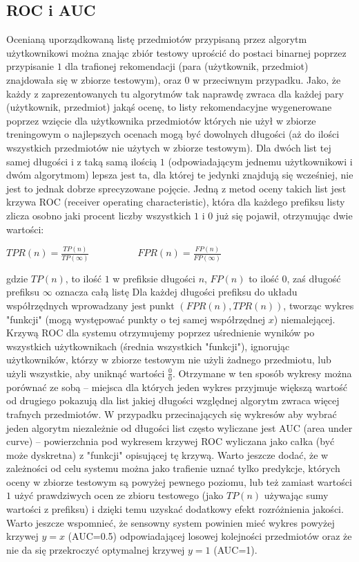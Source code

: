 \documentclass{pracamgr}
\begin{document}
   \subsection{ROC i AUC}
    Ocenianą uporządkowaną listę przedmiotów przypisaną przez algorytm użytkownikowi można znając zbiór testowy uprościć do postaci binarnej
    poprzez przypisanie $1$ dla trafionej rekomendacji (para (użytkownik, przedmiot) znajdowała się w zbiorze testowym), oraz $0$ w przeciwnym przypadku.
    Jako, że każdy z zaprezentowanych tu algorytmów tak naprawdę zwraca dla każdej pary (użytkownik, przedmiot) jakąś ocenę,
    to listy rekomendacyjne wygenerowane poprzez wzięcie dla użytkownika przedmiotów których nie użył w zbiorze treningowym o najlepszych ocenach
    mogą być dowolnych długości (aż do ilości wszystkich przedmiotów nie użytych w zbiorze testowym).
    Dla dwóch list tej samej długości i z taką samą ilością $1$ (odpowiadającym jednemu użytkownikowi i dwóm algorytmom) lepsza jest ta,
    dla której te jedynki znajdują się wcześniej, nie jest to jednak dobrze sprecyzowane pojęcie.
    Jedną z metod oceny takich list jest krzywa ROC (receiver operating characteristic), która dla każdego prefiksu listy zlicza osobno
    jaki procent liczby wszystkich $1$ i $0$ już się pojawił, otrzymując dwie wartości:
    \begin{center}
     $TPR(n)=\frac{TP(n)}{TP(\infty)}\quad\quad\quad\quad\quad
     FPR(n)=\frac{FP(n)}{FP(\infty)}$
    \end{center}
    {\scriptsize
     gdzie $TP(n)$, to ilość $1$ w prefiksie długości $n$, $FP(n)$ to ilość $0$, zaś długość prefiksu $\infty$ oznacza całą listę
    }\newline
    Dla każdej długości prefiksu do układu współrzędnych wprowadzany jest punkt\newline
    $(FPR(n),TPR(n))$, tworząc wykres "funkcji"
    (mogą występować punkty o tej samej współrzędnej $x$) niemalejącej. Krzywą ROC dla systemu otrzymujemy poprzez uśrednienie wyników
    po wszystkich użytkownikach (średnia wszystkich "funkcji"), ignorując użytkowników, którzy w zbiorze testowym nie użyli żadnego przedmiotu,
    lub użyli wszystkie, aby uniknąć wartości $\frac{0}{0}$.
    Otrzymane w ten sposób wykresy można porównać ze sobą -- miejsca dla których jeden wykres przyjmuje większą wartość od drugiego pokazują
    dla list jakiej długości względnej algorytm zwraca więcej trafnych przedmiotów.
    W przypadku przecinających się wykresów aby wybrać jeden algorytm niezależnie od długości list często wyliczane jest AUC (area under curve) --
    powierzchnia pod wykresem krzywej ROC wyliczana jako całka (być może dyskretna) z "funkcji" opisującej tę krzywą.
    Warto jeszcze dodać, że w zależności od celu systemu można jako trafienie uznać tylko predykcje, których oceny w zbiorze testowym są powyżej pewnego poziomu,
    lub też zamiast wartości $1$ użyć prawdziwych ocen ze zbioru testowego (jako $TP(n)$ używając sumy wartości z prefiksu)
    i dzięki temu uzyskać dodatkowy efekt rozróżnienia jakości.
    Warto jeszcze wspomnieć, że sensowny system powinien mieć wykres powyżej krzywej $y=x$ (AUC=0.5) odpowiadającej losowej kolejności przedmiotów
    oraz że nie da się przekroczyć optymalnej krzywej $y=1$ (AUC=1).
\end{document}
